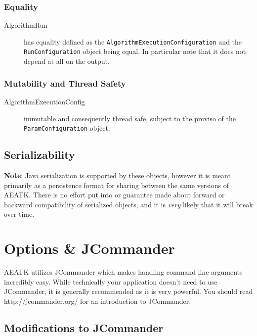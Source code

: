 \documentclass[11pt,letterpaper,oneside]{article}
\begin{document}
\subsubsection{Equality}
\begin{description}
\item[AlgorithmRun] has equality defined as the \texttt{AlgorithmExecutionConfiguration} 
and the \\
\texttt{RunConfiguration} object being equal. In particular note that it does not depend at all on the output. 
\end{description}

\subsubsection{Mutability and Thread Safety}
\begin{description}
\item[AlgorithmExecutionConfig] immutable and consequently thread safe, subject to the proviso of the \\
\texttt{ParamConfiguration} object.
\end{description}

\subsection{Serializability}

\textbf{Note}: Java serialization is supported by these objects, however it is meant primarily as a persistence format for sharing between the same versions of AEATK. There is no effort put into or guarantee made about forward or backward compatibility of serialized objects, and it is \emph{very} likely that it will break over time.

\section{Options \& JCommander}

AEATK utilizes JCommander which makes handling command line arguments incredibly easy. While technically your application doesn't need to use JCommander, it is generally recommended as it is very powerful. You should read http://jcommander.org/ for an introduction to JCommander.





\subsection{Modifications to JCommander}
\end{document}
